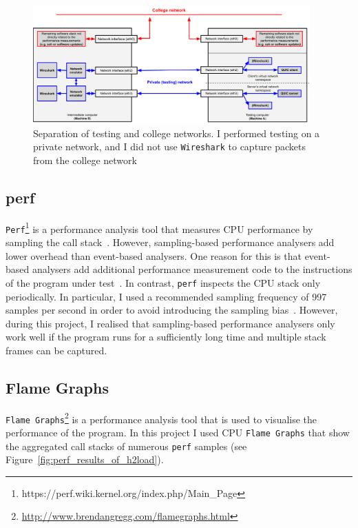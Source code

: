 \documentclass[12pt,a4paper]{report}
\begin{document}
    \begin{figure}[H]
    \centering
    \includegraphics[width=0.95\textwidth]{figs/Wireshark_separation.png}
    \caption[Separation of testing and college networks]{Separation of testing and college networks. I performed testing on a private network, and I did not use \texttt{Wireshark} to capture packets from the college network}
    \label{fig:Wireshark_separation}
    \end{figure}



\subsection{perf}
\texttt{Perf}\footnote{https://perf.wiki.kernel.org/index.php/Main\_Page} is a performance analysis tool that measures CPU performance by sampling the call stack~\cite{CPU_Flame_graphs}.
However, sampling-based performance analysers add lower overhead than event-based analysers.
One reason for this is that event-based analysers add additional performance measurement code to the instructions of the program under test~\cite{CPU_Flame_graphs}.
In contrast, \texttt{perf} inspects the CPU stack only periodically.
In particular, I used a recommended sampling frequency of 997 samples per second in order to avoid introducing the sampling bias~\cite{perf-cpu-sample}.
However, during this project, I realised that sampling-based performance analysers only work well if the program runs for a sufficiently long time and multiple stack frames can be captured.



\subsection{Flame Graphs}
\texttt{Flame Graphs}\footnote{\url{http://www.brendangregg.com/flamegraphs.html}} is a performance analysis tool that is used to visualise the performance of the program.
In this project I used CPU \texttt{Flame Graphs} that show the aggregated call stacks of numerous \texttt{perf} samples (see Figure~\ref{fig:perf_results_of_h2load}).
\end{document}
